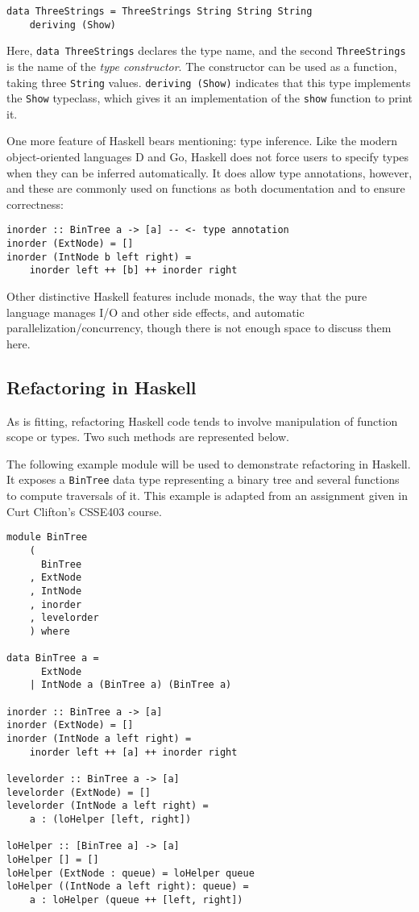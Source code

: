 \documentclass{article}
\begin{document}
\begin{verbatim}
data ThreeStrings = ThreeStrings String String String
    deriving (Show)
\end{verbatim}

\noindent Here, \verb!data ThreeStrings! declares the type name, and the second \verb!ThreeStrings! is the name of the \textit{type constructor}.  The constructor can be used as a function, taking three \verb!String! values.  \verb!deriving (Show)! indicates that this type implements the \verb!Show! typeclass, which gives it an implementation of the \verb!show! function to print it.

One more feature of Haskell bears mentioning: type inference.  Like the modern object-oriented languages D and Go, Haskell does not force users to specify types when they can be inferred automatically.  It does allow type annotations, however, and these are commonly used on functions as both documentation and to ensure correctness:

\begin{verbatim}
inorder :: BinTree a -> [a] -- <- type annotation
inorder (ExtNode) = []
inorder (IntNode b left right) =
    inorder left ++ [b] ++ inorder right
\end{verbatim}

Other distinctive Haskell features include monads, the way that the pure language manages I/O and other side effects, and automatic parallelization/concurrency, though there is not enough space to discuss them here.

\subsection{Refactoring in Haskell}

As is fitting, refactoring Haskell code tends to involve manipulation of function scope or types.  Two such methods are represented below.

The following example module will be used to demonstrate refactoring in Haskell.  It exposes a \verb!BinTree! data type representing a binary tree and several functions to compute traversals of it.  This example is adapted from an assignment given in Curt Clifton's CSSE403 course\cite{clifton2010}.

\begin{verbatim}
module BinTree
    (
      BinTree
    , ExtNode
    , IntNode
    , inorder
    , levelorder
    ) where

data BinTree a =
      ExtNode
    | IntNode a (BinTree a) (BinTree a)

inorder :: BinTree a -> [a]
inorder (ExtNode) = []
inorder (IntNode a left right) =
    inorder left ++ [a] ++ inorder right

levelorder :: BinTree a -> [a]
levelorder (ExtNode) = []
levelorder (IntNode a left right) =
    a : (loHelper [left, right])

loHelper :: [BinTree a] -> [a]
loHelper [] = []
loHelper (ExtNode : queue) = loHelper queue
loHelper ((IntNode a left right): queue) =
    a : loHelper (queue ++ [left, right])
\end{verbatim}
\end{document}
